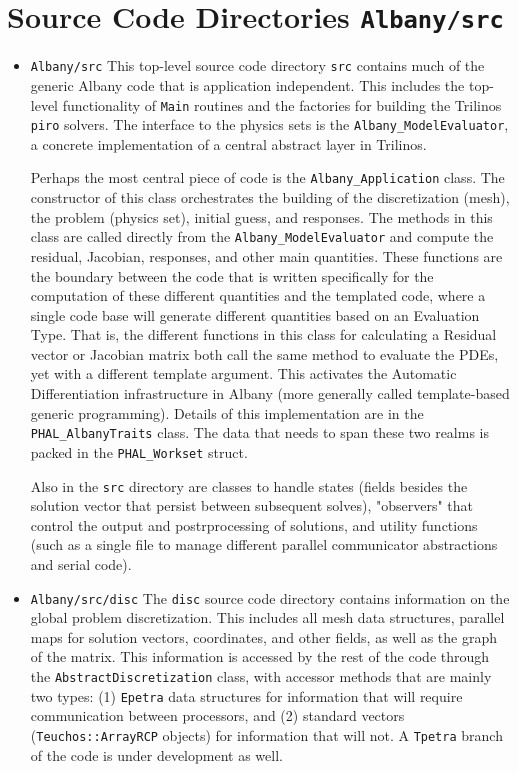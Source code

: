\documentclass[pdf,12pt,report,strict]{SANDreport}
\theoremstyle{remark}
\begin{document}
\section{Source Code Directories \texttt{Albany/src} }
\begin{itemize}

\item{\texttt{Albany/src}}  This top-level source code directory  \texttt{src} contains
much of the generic Albany code that is application independent. This includes the
top-level functionality of 
\texttt{Main} routines and the factories for building the Trilinos \texttt{piro} solvers.
The interface to the physics sets is the \texttt{Albany\_ModelEvaluator}, a concrete
implementation of a central abstract layer in Trilinos. 

Perhaps the most central piece of code is the \texttt{Albany\_Application} class.
The constructor of this class orchestrates the building of the discretization (mesh),
the problem (physics set), initial guess, and responses. The methods in this class
are called directly from the \texttt{Albany\_ModelEvaluator} and compute the residual,
Jacobian, responses, and other main quantities. These functions are the boundary between
the code that is written specifically for the computation of these different quantities
and the templated code, where a single code base will generate different quantities based
on an Evaluation Type. That is, the different functions in this class for calculating
a Residual vector or Jacobian matrix both call the same method to evaluate the PDEs, yet
with a different template argument. This activates the Automatic Differentiation 
infrastructure in Albany (more generally called template-based generic programming).
Details of this implementation are in the \texttt{PHAL\_AlbanyTraits} class. The data
that needs to span these two realms is packed in the \texttt{PHAL\_Workset} struct.

Also in the \texttt{src} directory are classes to handle states (fields besides the
solution vector that persist between subsequent solves), "observers" that control
the output and postrprocessing of solutions, and utility functions (such as a single
file to manage different parallel communicator abstractions and serial code).


\item{\texttt{Albany/src/disc}}  The \texttt{disc} source code directory contains information
on the global problem discretization. This includes all mesh data structures, parallel
maps for solution vectors, coordinates, and other fields, as well as the graph of the
matrix. This information is accessed by the rest of the code through the 
\texttt{AbstractDiscretization} class, with accessor methods that are mainly 
two types: (1) \texttt{Epetra} data structures for information that will 
require communication between processors, and (2)
standard vectors (\texttt{Teuchos::ArrayRCP} objects) for information that will not.
A \texttt{Tpetra} branch of the code is under development as well.


\end{itemize}
\end{document}
